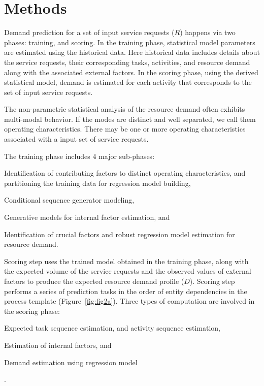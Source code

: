 \documentclass[twoside,leqno,twocolumn]{article}
\begin{document}
\section{Methods}
\label{sec:method}
Demand prediction for a set of input service requests ($R$) happens via two phases: training, and scoring. In the training phase, statistical model parameters are estimated using the historical data. Here historical data includes details about the service requests, their corresponding tasks, activities, and resource demand along with the associated external factors. In the scoring phase, using the derived statistical model, demand is estimated for each activity that corresponds to the set of input service requests.
\par 
The non-parametric statistical analysis of the resource demand often exhibits multi-modal behavior. If the modes are distinct and well separated, we call them operating characteristics. There may be one or more operating characteristics associated with a input set of service requests. 
\par The training phase includes 4 major sub-phases: 
\begin{enumerate*}
	\item Identification of contributing factors to distinct operating characteristics, and partitioning the training data for regression model building,
	\item Conditional sequence generator modeling, 
    \item Generative models for internal factor estimation, and
	\item Identification of crucial factors and robust regression model estimation for resource demand.
\end{enumerate*}
\par
Scoring step uses the trained model obtained in the training phase, along with the expected volume of the service requests and the observed values of external factors to produce the expected resource demand profile ($D$). Scoring step performs a series of prediction tasks in the order of entity dependencies in the process template (Figure~\ref{fig:fig2a}). Three types of computation are involved in the scoring phase:
\begin{enumerate*}
\item Expected task sequence estimation, and activity sequence estimation, 
\item Estimation of internal factors, and
\item Demand estimation using regression model
\end{enumerate*}.
\end{document}
